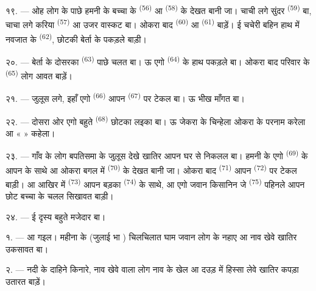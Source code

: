 १९. --- ओह लोग के पाछे हमनी के बच्चा के 
\textsuperscript{(56)} आ  \textsuperscript{(58)} के देखत बानी
जा। चाची लगे सुंदर  \textsuperscript{(59)} बा, चाचा लगे करिया
 \textsuperscript{(57)} आ उजर वास्कट बा। ओकरा बाद
 \textsuperscript{(60)} आ 
\textsuperscript{(61)} बाड़ें। ई चचेरी बहिन हाथ में नवजात के
 \textsuperscript{(62)}, छोटकी बेर्ता के पकड़ले बाड़ी।

२०. --- बेर्ता के दोसरका  \textsuperscript{(63)} पाछे चलत
बा। ऊ एगो  \textsuperscript{(64)} के हाथ पकड़ले बा।
ओकरा बाद परिवार के  \textsuperscript{(65)} लोग आवत बाड़ें।

\VUsaut{4.6mm}
\VUsaut{3.4mm}

२१. --- जुलूस लगे, इहाँ एगो  \textsuperscript{(66)} आपन
 \textsuperscript{(67)} पर टेकल बा। ऊ भीख माँगत बा।

२२. --- दोसरा ओर एगो बहुते  \textsuperscript{(68)} छोटका
लइका बा। ऊ जेकरा के चिन्हेला ओकरा के परनाम करेला आ « 
» कहेला।

२३. --- गाँव के लोग बपतिसमा के जुलूस देखे खातिर आपन घर से निकलल बा।
हमनी के एगो  \textsuperscript{(69)} के आपन  के साथे आ ओकरा बगल में  \textsuperscript{(70)} के
देखत बानी जा। ओकरा बाद  \textsuperscript{(71)} आपन
 \textsuperscript{(72)} पर टेकल बाड़ी। आ आखिर में
 \textsuperscript{(73)} आपन बड़का  \textsuperscript{(74)} के साथे, आ एगो जवान किसानिन जे
 \textsuperscript{(75)} पहिनले आपन छोट बच्चा के
चलल सिखावत बाड़ी।

२४. --- ई दृस्य बहुते मजेदार बा।

\VUsaut{4.0mm}
\VUsaut{3.0mm}

\VUsaut{2.4mm}

\VUsaut{3.0mm}

१. ---  आ गइल।  महीना के (जुलाई भा
) चिलचिलात घाम जवान लोग के नहाए आ नाव खेवे खातिर उकसावत
बा।

२. --- नदी के दाहिने किनारे, नाव खेवे वाला लोग नाव के खेल आ दउड़ में
हिस्सा लेवे खातिर कपड़ा उतारत बाड़ें।

